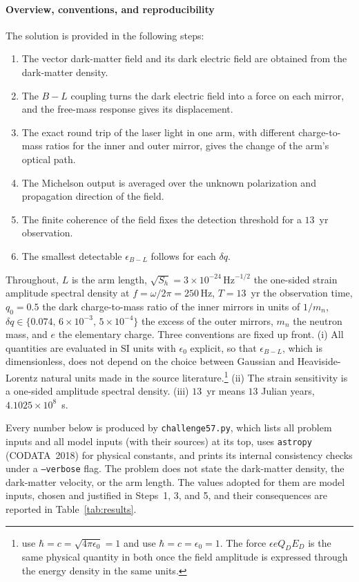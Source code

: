 \paragraph*{Overview, conventions, and reproducibility}
The solution is provided in the following steps:
%
\begin{enumerate}[label=Step~\arabic*:,leftmargin=*,align=left,labelsep=0.5em,parsep=0pt,itemsep=0.1em,topsep=0.2em]
    \item The vector dark-matter field and its dark electric field are obtained from the dark-matter density.
    \item The $B-L$ coupling turns the dark electric field into a force on each mirror, and the free-mass response gives its displacement.
    \item The exact round trip of the laser light in one arm, with different charge-to-mass ratios for the inner and outer mirror, gives the change of the arm's optical path.
    \item The Michelson output is averaged over the unknown polarization and propagation direction of the field.
    \item The finite coherence of the field fixes the detection threshold for a $13$~yr observation.
    \item The smallest detectable $\epsilon_{B-L}$ follows for each $\delta q$.
\end{enumerate}
%
Throughout, $L$ is the arm length, $\sqrt{S_h}=3\times10^{-24}\,\mathrm{Hz}^{-1/2}$ the one-sided strain amplitude spectral density at $f=\omega/2\pi=250\,\mathrm{Hz}$, $T=13$~yr the observation time, $q_0=0.5$ the dark charge-to-mass ratio of the inner mirrors in units of $1/m_n$, $\delta q\in\{0.074,\,6\times10^{-3},\,5\times10^{-4}\}$ the excess of the outer mirrors, $m_n$ the neutron mass, and $e$ the elementary charge. Three conventions are fixed up front. (i) All quantities are evaluated in SI units with $\epsilon_0$ explicit, so that $\epsilon_{B-L}$, which is dimensionless, does not depend on the choice between Gaussian and Heaviside-Lorentz natural units made in the source literature.\footnote{\citet{Pierce2018} use $\hbar=c=\sqrt{4\pi\epsilon_0}=1$ and \citet{Morisaki2021} use $\hbar=c=\epsilon_0=1$. The force $\epsilon eQ_DE_D$ is the same physical quantity in both once the field amplitude is expressed through the energy density in the same units.} (ii) The strain sensitivity is a one-sided amplitude spectral density. (iii) $13$~yr means $13$ Julian years, $4.1025\times10^{8}$~s.

Every number below is produced by \texttt{challenge57.py}, which lists all problem inputs and all model inputs (with their sources) at its top, uses \texttt{astropy} (CODATA~2018) for physical constants, and prints its internal consistency checks under a \texttt{--verbose} flag. The problem does not state the dark-matter density, the dark-matter velocity, or the arm length. The values adopted for them are model inputs, chosen and justified in Steps~1, 3, and 5, and their consequences are reported in Table~\ref{tab:results}.

